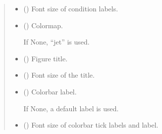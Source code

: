 \documentclass[letterpaper,10pt,english]{sphinxhowto}
\begin{document}
\begin{fulllineitems}
\begin{quote}
\begin{description}
\begin{itemize}
\item {} 
\sphinxAtStartPar
{} (\sphinxstyleliteralemphasis{\sphinxupquote{, }}) \textendash{} Font size of condition labels.

\item {} 
\sphinxAtStartPar
{} (\sphinxstyleliteralemphasis{\sphinxupquote{, }}) \textendash{} 
\sphinxAtStartPar
Colormap.

\sphinxAtStartPar
If None, “jet” is used.


\item {} 
\sphinxAtStartPar
{} (\sphinxstyleliteralemphasis{\sphinxupquote{, }}) \textendash{} Figure title.

\item {} 
\sphinxAtStartPar
{} (\sphinxstyleliteralemphasis{\sphinxupquote{, }}) \textendash{} Font size of the title.

\item {} 
\sphinxAtStartPar
{} (\sphinxstyleliteralemphasis{\sphinxupquote{, }}) \textendash{} 
\sphinxAtStartPar
Colorbar label.

\sphinxAtStartPar
If None, a default label is used.


\item {} 
\sphinxAtStartPar
{} (\sphinxstyleliteralemphasis{\sphinxupquote{, }}) \textendash{} Font size of colorbar tick labels and label.


\end{itemize}
\end{description}
\end{quote}
\end{fulllineitems}
\end{document}
